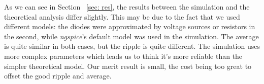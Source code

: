 As we can see in Section ~\ref{sec: res}, the results between the simulation and the theoretical analysis differ slightly. This may be due to the fact that we used different models: the diodes were approximated by voltage sources or resistors in the second, while \textit{ngspice}'s default model was used in the simulation. The average is quite similar in both cases, but the ripple is quite different. The simulation uses more complex parameters which leads us to think it's more reliable than the simpler theoretical model. Our merit result is small, the cost being too great to offset the good ripple and average.